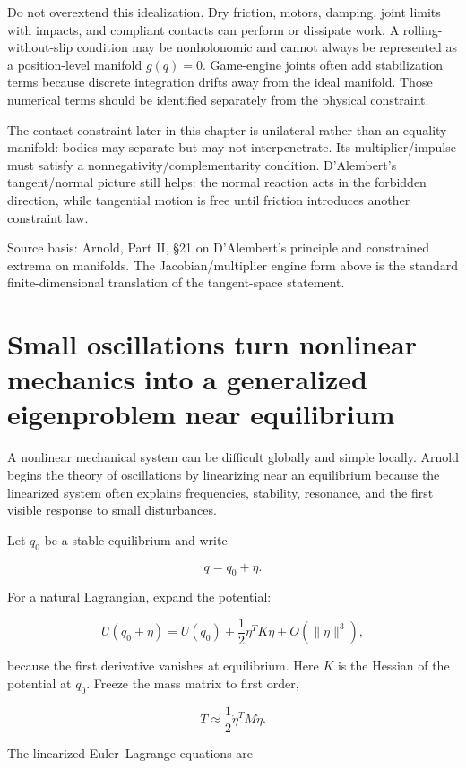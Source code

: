 Do not overextend this idealization. Dry friction, motors, damping, joint limits with impacts, and compliant contacts can perform or dissipate work. A rolling-without-slip condition may be nonholonomic and cannot always be represented as a position-level manifold \(g(q)=0\). Game-engine joints often add stabilization terms because discrete integration drifts away from the ideal manifold. Those numerical terms should be identified separately from the physical constraint.

The contact constraint later in this chapter is unilateral rather than an equality manifold: bodies may separate but may not interpenetrate. Its multiplier/impulse must satisfy a nonnegativity/complementarity condition. D'Alembert's tangent/normal picture still helps: the normal reaction acts in the forbidden direction, while tangential motion is free until friction introduces another constraint law.

Source basis: Arnold, Part II, §21 on D'Alembert's principle and constrained extrema on manifolds. The Jacobian/multiplier engine form above is the standard finite-dimensional translation of the tangent-space statement.

\section{Small oscillations turn nonlinear mechanics into a generalized eigenproblem near equilibrium}\label{02-foundations-ii-ch039-small-oscillations-turn-nonlinear-mechanics-into-a-generalized-eigenproblem-near-equilibrium}

A nonlinear mechanical system can be difficult globally and simple locally. Arnold begins the theory of oscillations by linearizing near an equilibrium because the linearized system often explains frequencies, stability, resonance, and the first visible response to small disturbances.

Let \(q_0\) be a stable equilibrium and write

\[
q=q_0+\eta.
\]

For a natural Lagrangian, expand the potential:

\[
U(q_0+\eta)
=
U(q_0)
+
\frac12\eta^T K\eta
+
O(\|\eta\|^3),
\]

because the first derivative vanishes at equilibrium. Here \(K\) is the Hessian of the potential at \(q_0\). Freeze the mass matrix to first order,

\[
T
\approx
\frac12\dot\eta^T M\dot\eta.
\]

The linearized Euler--Lagrange equations are

